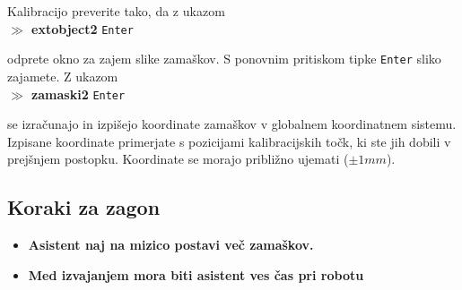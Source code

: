 Kalibracijo preverite tako, da z ukazom \\

\vspace{-0.3cm}%
\textbf{$\gg$ extobject2} \verb"Enter"\\ %
\vspace{-0.1cm}%

odprete okno za zajem slike zamaškov. S ponovnim pritiskom tipke \verb"Enter" sliko zajamete. Z ukazom  \\

\vspace{-0.3cm}%
\textbf{$\gg$ zamaski2} \verb"Enter" \\%
\vspace{-0.1cm}%

se izračunajo in izpišejo koordinate zamaškov v globalnem koordinatnem sistemu. Izpisane koordinate primerjate s pozicijami kalibracijskih točk, ki ste jih dobili v prejšnjem postopku. Koordinate se morajo približno ujemati ($\pm1mm$).

\vspace{-0.2cm}
\subsection{Koraki za zagon}
\vspace{0.3cm} %

\begin{mdframed}[backgroundcolor=red!20, shadow=true,roundcorner=8pt]
\begin{itemize}
  \item \textbf{Asistent naj na mizico postavi več zamaškov.}
  \item \textbf{Med izvajanjem mora biti asistent ves čas pri robotu}
\end{itemize}
\end{mdframed}


